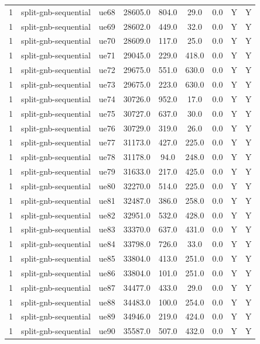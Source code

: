 \begin{table}[ht]
\begin{tabular}{|c|c|c|c|c|c|c|c|c|}
1 & split-gnb-sequential & ue68 & 28605.0 & 804.0 & 29.0 & 0.0 & Y & Y \\
1 & split-gnb-sequential & ue69 & 28602.0 & 449.0 & 32.0 & 0.0 & Y & Y \\
1 & split-gnb-sequential & ue70 & 28609.0 & 117.0 & 25.0 & 0.0 & Y & Y \\
1 & split-gnb-sequential & ue71 & 29045.0 & 229.0 & 418.0 & 0.0 & Y & Y \\
1 & split-gnb-sequential & ue72 & 29675.0 & 551.0 & 630.0 & 0.0 & Y & Y \\
1 & split-gnb-sequential & ue73 & 29675.0 & 223.0 & 630.0 & 0.0 & Y & Y \\
1 & split-gnb-sequential & ue74 & 30726.0 & 952.0 & 17.0 & 0.0 & Y & Y \\
1 & split-gnb-sequential & ue75 & 30727.0 & 637.0 & 30.0 & 0.0 & Y & Y \\
1 & split-gnb-sequential & ue76 & 30729.0 & 319.0 & 26.0 & 0.0 & Y & Y \\
1 & split-gnb-sequential & ue77 & 31173.0 & 427.0 & 225.0 & 0.0 & Y & Y \\
1 & split-gnb-sequential & ue78 & 31178.0 & 94.0 & 248.0 & 0.0 & Y & Y \\
1 & split-gnb-sequential & ue79 & 31633.0 & 217.0 & 425.0 & 0.0 & Y & Y \\
1 & split-gnb-sequential & ue80 & 32270.0 & 514.0 & 225.0 & 0.0 & Y & Y \\
1 & split-gnb-sequential & ue81 & 32487.0 & 386.0 & 258.0 & 0.0 & Y & Y \\
1 & split-gnb-sequential & ue82 & 32951.0 & 532.0 & 428.0 & 0.0 & Y & Y \\
1 & split-gnb-sequential & ue83 & 33370.0 & 637.0 & 431.0 & 0.0 & Y & Y \\
1 & split-gnb-sequential & ue84 & 33798.0 & 726.0 & 33.0 & 0.0 & Y & Y \\
1 & split-gnb-sequential & ue85 & 33804.0 & 413.0 & 251.0 & 0.0 & Y & Y \\
1 & split-gnb-sequential & ue86 & 33804.0 & 101.0 & 251.0 & 0.0 & Y & Y \\
1 & split-gnb-sequential & ue87 & 34477.0 & 433.0 & 29.0 & 0.0 & Y & Y \\
1 & split-gnb-sequential & ue88 & 34483.0 & 100.0 & 254.0 & 0.0 & Y & Y \\
1 & split-gnb-sequential & ue89 & 34946.0 & 219.0 & 424.0 & 0.0 & Y & Y \\
1 & split-gnb-sequential & ue90 & 35587.0 & 507.0 & 432.0 & 0.0 & Y & Y \\

\end{tabular}
\end{table}
